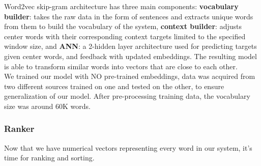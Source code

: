 Word2vec skip-gram architecture has three main components: \textbf{vocabulary builder}: takes the raw data in the form of sentences and extracts unique words from them to build the vocabulary of the system, \textbf{context builder}: adjusts center words with their corresponding context targets limited to the specified window size, and \textbf{ANN}: a 2-hidden layer architecture used for predicting targets given center words, and feedback with updated embeddings. The resulting model is able to transform similar words into vectors that are close to each other.\\

We trained our model with NO pre-trained embeddings, data was acquired from two different sources trained on one and tested on the other, to ensure generalization of our model. After pre-processing training data, the vocabulary size was around 60K words.

\subsubsection{Ranker}
\label{sec:ranker}
Now that we have numerical vectors representing every word in our system, it's time for ranking and sorting.

